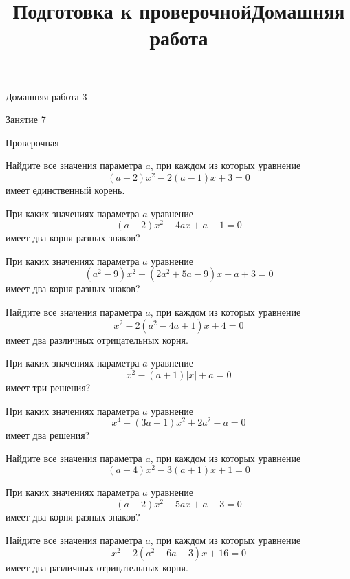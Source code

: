\begin{homework}[number=3]
	\begin{listofex}
		\item Домашняя работа 3
	\end{listofex}
\end{homework}

\begin{class}[number=7]
	\title{Подготовка к проверочной}
	\begin{listofex}
		\item Занятие 7
	\end{listofex}
\end{class}

\begin{exam}
	\begin{listofex}
		\item Проверочная
	\end{listofex}
\end{exam}

\begin{class}[number=доп. занятие]
	\begin{listofex}
		\item Найдите все значения параметра \( a \), при каждом из которых уравнение
		\[ (a-2)x^2-2(a-1)x+3=0 \]
		имеет единственный корень.
		\item При каких значениях параметра \( a \) уравнение
		\[ (a-2)x^2-4ax+a-1=0 \]
		имеет два корня разных знаков?
		\item При каких значениях параметра \( a \) уравнение
		\[ (a^2-9)x^2-(2a^2+5a-9)x+a+3=0 \]
		имеет два корня разных знаков?
		\item Найдите все значения параметра \( a \), при каждом из которых уравнение
		\[ x^2-2(a^2-4a+1)x+4=0 \]
		имеет два различных отрицательных корня.
		\item При каких значениях параметра \( a \) уравнение
		\[ x^2-(a+1)|x|+a=0 \]
		имеет три решения?
		\item При каких значениях параметра \( a \) уравнение
		\[ x^4-(3a-1)x^2+2a^2-a=0 \]
		имеет два решения?
	\end{listofex}
	\newpage
	\title{Домашняя работа}
	\begin{listofex}
		\item Найдите все значения параметра \( a \), при каждом из которых уравнение
		\[ (a-4)x^2-3(a+1)x+1=0 \]
		\item При каких значениях параметра \( a \) уравнение
		\[ (a+2)x^2-5ax+a-3=0 \]
		имеет два корня разных знаков?
		\item Найдите все значения параметра \( a \), при каждом из которых уравнение
		\[ x^2+2(a^2-6a-3)x+16=0 \]
		имеет два различных отрицательных корня.
	\end{listofex}
\end{class}
